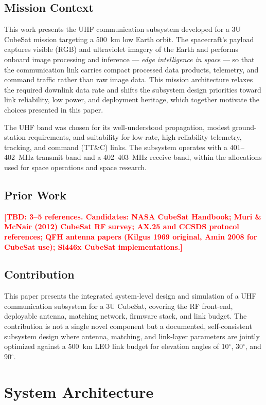 \documentclass[conference]{IEEEtran}
\newcommand{\tbd}[1]{\textcolor{red}{\textbf{[TBD: #1]}}}
\begin{document}
\subsection{Mission Context}
This work presents the UHF communication subsystem developed for a 3U CubeSat mission targeting a 500~km low Earth orbit. The spacecraft's payload captures visible (RGB) and ultraviolet imagery of the Earth and performs onboard image processing and inference --- \textit{edge intelligence in space} --- so that the communication link carries compact processed data products, telemetry, and command traffic rather than raw image data. This mission architecture relaxes the required downlink data rate and shifts the subsystem design priorities toward link reliability, low power, and deployment heritage, which together motivate the choices presented in this paper.

The UHF band was chosen for its well-understood propagation, modest ground-station requirements, and suitability for low-rate, high-reliability telemetry, tracking, and command (TT\&C) links. The subsystem operates with a 401--402~MHz transmit band and a 402--403~MHz receive band, within the allocations used for space operations and space research.

\subsection{Prior Work}
\tbd{3--5 references. Candidates: NASA CubeSat Handbook; Muri \& McNair (2012) CubeSat RF survey; AX.25 and CCSDS protocol references; QFH antenna papers (Kilgus 1969 original, Amin 2008 for CubeSat use); Si446x CubeSat implementations.}

\subsection{Contribution}
This paper presents the integrated system-level design and simulation of a UHF communication subsystem for a 3U CubeSat, covering the RF front-end, deployable antenna, matching network, firmware stack, and link budget. The contribution is not a single novel component but a documented, self-consistent subsystem design where antenna, matching, and link-layer parameters are jointly optimized against a 500~km LEO link budget for elevation angles of 10$^\circ$, 30$^\circ$, and 90$^\circ$.

\section{System Architecture}
\end{document}
